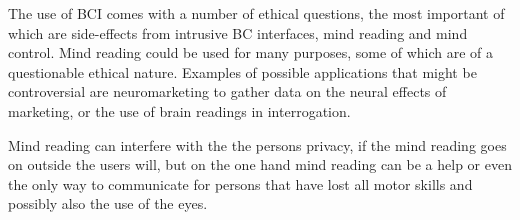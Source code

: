 The use of BCI comes with a number of ethical questions, the most important of which are side-effects from intrusive BC interfaces, mind reading and mind control. Mind reading could be used for many purposes, some of which are of a questionable ethical nature. Examples of possible applications that might be controversial are neuromarketing to gather data on the neural effects of marketing, or the use of brain readings in interrogation\cite{10.1371/journal.pbio.1001289}\cite{CB:CB252}.

Mind reading can interfere with the the persons privacy, if the mind reading goes on outside the users will, but on the one hand mind reading can be a help or even the only way to communicate for persons that have lost all motor skills and possibly also the use of the eyes.

